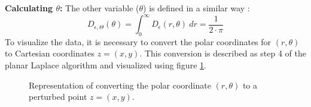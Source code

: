 \textbf{Calculating $\theta$:}
The other variable ($\theta$) is defined in a similar way \citep{DBLP:journals/corr/abs-1212-1984}: 
\begin{equation}
    D_{\epsilon, \Theta}(\theta) = \int^\infty_0 D_\epsilon(r, \theta) \ dr = \frac{1}{2 \cdot \pi}
    \label{2d:generate-theta}
\end{equation}
To visualize the data, it is necessary to convert the polar coordinates for $(r, \theta)$ to Cartesian coordinates $z = (x, y)$.
This conversion is described as step 4 of the planar Laplace algorithm \citep{DBLP:journals/corr/abs-1212-1984} and visualized using figure \ref{figure:geo}.
\begin{figure}[h]
    \centering
  
  \centering
  \caption{Representation of converting the polar coordinate $(r, \theta)$ to a perturbed point $z = (x, y)$.}
  \label{figure:geo}
\end{figure}

\newpage
